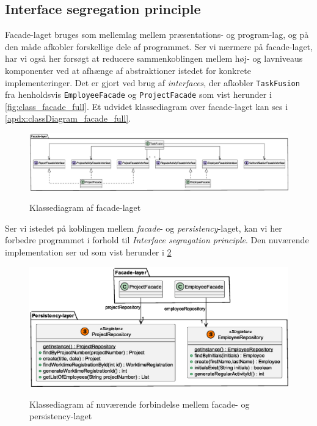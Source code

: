 \subsection{Interface segregation principle} \label{sec:solid_i}
Facade-laget bruges som mellemlag mellem præsentations- og program-lag, og på den måde afkobler forskellige dele af programmet. Ser vi nærmere på facade-laget, har vi også her forsøgt at reducere sammenkoblingen mellem høj- og lavniveaus komponenter ved at afhænge af abstraktioner istedet for konkrete implementeringer. Det er gjort ved brug af \textit{interfaces}, der afkobler \texttt{TaskFusion} fra henholdsvis \texttt{EmployeeFacade} og \texttt{ProjectFacade} som vist herunder i \cref{fig:class_facade_full}. Et udvidet klassediagram over facade-laget kan ses i \cref{apdx:classDiagram_facade_full}.
\begin{figure}[H]
  \centering
  \caption{Klassediagram af facade-laget}
  \includegraphics[width = \textwidth]{ImplementationAndTest/Diagrams/ClassDiagrams/ClassDiagram_facade_simple.eps}
  \label{fig:class_facade_simple}
\end{figure}
Ser vi istedet på koblingen mellem \textit{facade}- og \textit{persistency}-laget, kan vi her forbedre programmet i forhold til \textit{Interface segragation principle}. Den nuværende implementation ser ud som vist herunder i \cref{fig:class_facade_persistency_current}
\begin{figure}[H]
  \centering
  \caption{Klassediagram af nuværende forbindelse mellem facade- og persistency-laget}
  \includegraphics[width = 12cm]{ImplementationAndTest/Diagrams/ClassDiagrams/persistency_to_facade_example.eps}
  \label{fig:class_facade_persistency_current}
\end{figure}
